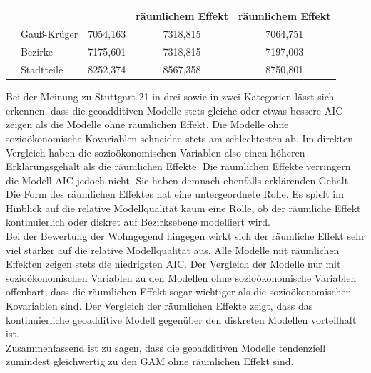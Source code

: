 \documentclass{Vorlage}
\begin{document}
\begin{table}[h]
\begin{tabular}{llccc}
                          & \multicolumn{1}{l|}{}             & \multicolumn{1}{c|}{}                                     & \multicolumn{1}{c|}{räumlichem Effekt} & räumlichem Effekt \\ \hline
                          & \multicolumn{1}{l|}{Gauß-Krüger} & \multicolumn{1}{c|}{7054,163}                             & \multicolumn{1}{c|}{7318,815}          & 7064,751          \\
                          & \multicolumn{1}{l|}{Bezirke}      & \multicolumn{1}{c|}{7175,601}                             & \multicolumn{1}{c|}{7318,815}          & 7197,003          \\
                          & \multicolumn{1}{l|}{Stadtteile}   & \multicolumn{1}{c|}{8252,374}                             & \multicolumn{1}{c|}{8567,358}          & 8750,801          \\ \hline \hline
\end{tabular}
\end{table}


Bei der Meinung zu Stuttgart 21 in drei sowie in zwei Kategorien lässt sich erkennen, dass die geoadditiven Modelle stets gleiche oder etwas bessere AIC zeigen als die Modelle ohne räumlichen Effekt. Die Modelle ohne sozioökonomische Kovariablen schneiden stets am schlechtesten ab. Im direkten Vergleich haben die sozioökonomischen Variablen also einen höheren Erklärungsgehalt als die räumlichen Effekte. Die räumlichen Effekte verringern die Modell AIC jedoch nicht. Sie haben demnach ebenfalls erklärenden Gehalt. Die Form des räumlichen Effektes hat eine untergeordnete Rolle. Es spielt im Hinblick auf die relative Modellqualität kaum eine Rolle, ob der räumliche Effekt kontinuierlich oder diskret auf Bezirksebene modelliert wird.\\
Bei der Bewertung der Wohngegend hingegen wirkt sich der räumliche Effekt sehr viel stärker auf die relative Modellqualität aus. Alle Modelle mit räumlichen Effekten zeigen stets die niedrigsten AIC. Der Vergleich der Modelle nur mit sozioökonomischen Variablen zu den Modellen ohne sozioökonomische Variablen offenbart, dass die räumlichen Effekt sogar wichtiger als die sozioökonomischen Kovariablen sind. Der Vergleich der räumlichen Effekte zeigt, dass das kontinuierliche geoadditive Modell gegenüber den diskreten Modellen vorteilhaft ist.\\
Zusammenfassend ist zu sagen, dass die geoadditiven Modelle tendenziell zumindest gleichwertig zu den GAM ohne räumlichen Effekt sind.
\end{document}
